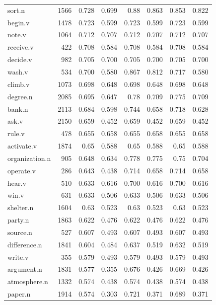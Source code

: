 \documentclass{article}
\begin{document}
\begin{longtable}{l | r r r r r r r}
sort.n      	&	1566	&	0.728	&	0.699	&	0.88	&	0.863	&	0.853	&	0.822\\
begin.v     	&	1478	&	0.723	&	0.599	&	0.723	&	0.599	&	0.723	&	0.599\\
note.v      	&	1064	&	0.712	&	0.707	&	0.712	&	0.707	&	0.712	&	0.707\\
receive.v    	&	422 	&	0.708	&	0.584	&	0.708	&	0.584	&	0.708	&	0.584\\
decide.v    	&	982 	&	0.705	&	0.700	&	0.705	&	0.700	&	0.705	&	0.700\\
wash.v      	&	534 	&	0.700	&	0.580	&	0.867	&	0.812	&	0.717	&	0.580\\
climb.v     	&	1073	&	0.698	&	0.648	&	0.698	&	0.648	&	0.698	&	0.648\\
degree.n    	&	2085	&	0.695	&	0.647	&	0.78	&	0.709	&	0.775	&	0.709\\
bank.n      	&	2113	&	0.684	&	0.598   &	0.744	&	0.658	&	0.718	&	0.628\\
ask.v       	&	2150	&	0.659	&	0.452	&	0.659	&	0.452	&	0.659	&	0.452\\
rule.v      	&	478 	&	0.655	&	0.658	&	0.655	&	0.658	&	0.655	&	0.658\\
activate.v    	&	1874	&	0.65	&	0.588	&	0.65	&	0.588	&	0.65	&	0.588\\
organization.n	&	905 	&	0.648	&	0.634	&	0.778	&	0.775	&	0.75	&	0.704\\
operate.v    	&	286 	&	0.643	&	0.438	&	0.714	&	0.658	&	0.714	&	0.658\\
hear.v      	&	510 	&	0.633	&	0.616	&	0.700	&	0.616	&	0.700	&	0.616\\
win.v       	&	631 	&	0.633	&	0.506	&	0.633	&	0.506	&	0.633	&	0.506\\
shelter.n    	&	1604	&	0.63	&	0.523	&	0.63	&	0.523	&	0.63	&	0.523\\
party.n     	&	1863	&	0.622	&	0.476	&	0.622	&	0.476	&	0.622	&	0.476\\
source.n    	&	527 	&	0.607	&	0.493	&	0.607	&	0.493	&	0.607	&	0.493\\
difference.n	&	1841	&	0.604	&	0.484	&	0.637	&	0.519	&	0.632	&	0.519\\
write.v     	&	355 	&	0.579	&	0.493	&	0.579	&	0.493	&	0.579	&	0.493\\
argument.n    	&	1831	&	0.577	&	0.355   &	0.676	&	0.426	&	0.669	&	0.426\\
atmosphere.n	&	1332	&	0.574	&	0.438	&	0.574	&	0.438	&	0.574	&	0.438\\
paper.n     	&	1914	&	0.574	&	0.303	&	0.721	&	0.371	&	0.689	&	0.371\\

\end{longtable}
\end{document}
